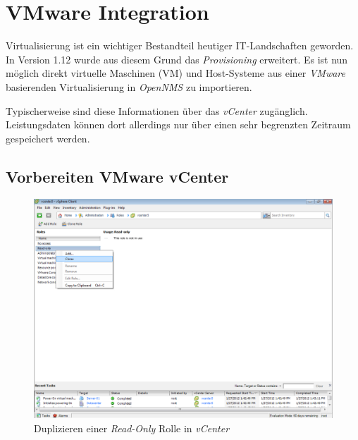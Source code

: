 \section{VMware Integration}
Virtualisierung ist ein wichtiger Bestandteil heutiger IT-Landschaften geworden. In Version 1.12 wurde aus diesem Grund das \emph{Provisioning} erweitert. Es ist nun möglich direkt virtuelle Maschinen (VM) und Host-Systeme aus einer \emph{VMware} basierenden Virtualisierung in \emph{OpenNMS} zu importieren.

Typischerweise sind diese Informationen über das \emph{vCenter} zugänglich. Leistungsdaten können dort allerdings nur über einen sehr begrenzten Zeitraum gespeichert werden.

\subsection{Vorbereiten VMware vCenter}

\begin{figure}[H]
	\centering
	\includegraphics[width=1.0\textwidth]{images/3rd-party/vmware/0-cloning}
	\caption{Duplizieren einer \emph{Read-Only} Rolle in \emph{vCenter}}
	\label{pic:vmware-cloning}
\end{figure}

